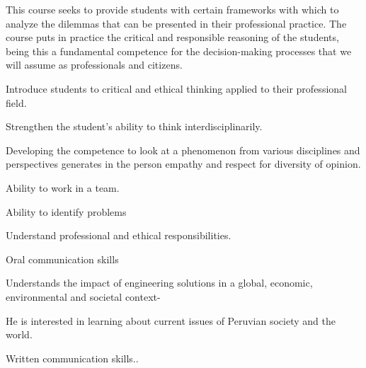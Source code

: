\begin{syllabus}


\begin{justification}
This course seeks to provide students with certain frameworks with which to analyze the dilemmas that can be presented in their professional practice. The course puts in practice the critical and responsible reasoning of the students, being this a fundamental competence for the decision-making processes that we will assume as professionals and citizens.
\end{justification}

\begin{goals}
\item Introduce students to critical and ethical thinking applied to their professional field.
\item Strengthen the student's ability to think interdisciplinarily.
\item Developing the competence to look at a phenomenon from various disciplines and perspectives generates in the person empathy and respect for diversity of opinion.
\item Ability to work in a team.
\item Ability to identify problems
\item Understand professional and ethical responsibilities.
\item Oral communication skills
\item Understands the impact of engineering solutions in a global, economic, environmental and societal context-
\item He is interested in learning about current issues of Peruvian society and the world.
\item Written communication skills..
\end{goals}

\begin{outcomes}
    \item {}
    \item {}
\end{outcomes}

\begin{competences}
    \item {}
\end{competences}



\end{syllabus}
